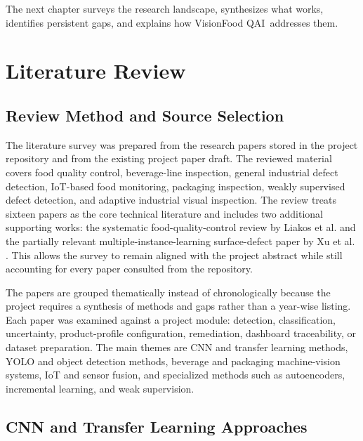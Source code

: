 \documentclass[12pt,a4paper]{report}
\newcommand{\shorttitle}{VisionFood QAI}
\begin{document}
The next chapter surveys the research landscape, synthesizes what works, identifies persistent gaps, and explains how \shorttitle\ addresses them.

\chapter{Literature Review}
\label{ch:literature-review}

\section{Review Method and Source Selection}
\label{sec:review-method}

The literature survey was prepared from the research papers stored in the project repository and from the existing project paper draft. The reviewed material covers food quality control, beverage-line inspection, general industrial defect detection, IoT-based food monitoring, packaging inspection, weakly supervised defect detection, and adaptive industrial visual inspection. The review treats sixteen papers as the core technical literature and includes two additional supporting works: the systematic food-quality-control review by Liakos et al. \cite{liakos2025review} and the partially relevant multiple-instance-learning surface-defect paper by Xu et al. \cite{xu2024mil}. This allows the survey to remain aligned with the project abstract while still accounting for every paper consulted from the repository.

The papers are grouped thematically instead of chronologically because the project requires a synthesis of methods and gaps rather than a year-wise listing. Each paper was examined against a project module: detection, classification, uncertainty, product-profile configuration, remediation, dashboard traceability, or dataset preparation. The main themes are CNN and transfer learning methods, YOLO and object detection methods, beverage and packaging machine-vision systems, IoT and sensor fusion, and specialized methods such as autoencoders, incremental learning, and weak supervision.

\section{CNN and Transfer Learning Approaches}
\label{sec:cnn-transfer}
\end{document}
